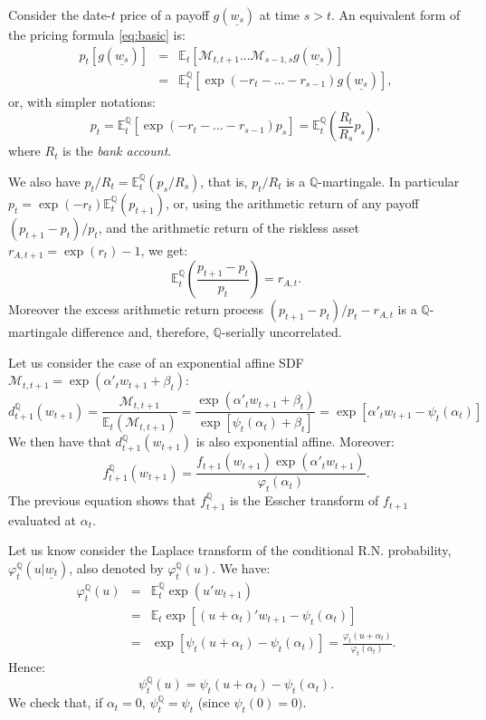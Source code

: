 \documentclass[
  12pt,
]{book}
\theoremstyle{definition}
\theoremstyle{definition}
\theoremstyle{definition}
\theoremstyle{definition}
\theoremstyle{remark}
\begin{document}
Consider the date-\(t\) price of a payoff \(g(\underline{w_s})\) at time \(s>t\). An equivalent form of the pricing formula \eqref{eq:basic} is:
\begin{eqnarray*}
p_t[g(\underline{w_s})] &=& \mathbb{E}_t[\mathcal{M}_{t,t+1}...\mathcal{M}_{s-1,s}g(\underline{w_s})] \\
&=& \mathbb{E}^{\mathbb{Q}}_t[\exp(-r_{t}-...-r_{s-1})g(\underline{w_s})],
\end{eqnarray*}
or, with simpler notations:
\[
p_t = \mathbb{E}^{\mathbb{Q}}_t[\exp(-r_{t}-...-r_{s-1})p_s] = \mathbb{E}^{\mathbb{Q}}_t\left(\frac{R_t}{R_s} p_s\right),
\]
where \(R_t\) is the \emph{bank account}.

We also have \(p_t/R_t = \mathbb{E}^{\mathbb{Q}}_t\left( p_s/R_s\right)\), that is, \(p_t/R_t\) is a \(\mathbb{Q}\)-martingale. In particular \(p_t = \exp(-r_{t})\mathbb{E}^{\mathbb{Q}}_t(p_{t+1})\), or, using the arithmetic return of any payoff \((p_{t+1}-p_t)/p_t\), and the arithmetic return of the riskless asset \(r_{A,t+1}=\exp(r_{t})-1\), we get:
\[
\mathbb{E}^{\mathbb{Q}}_t\left(\frac{p_{t+1}-p_t}{p_t}\right)=r_{A,t}.
\]
Moreover the excess arithmetic return process \((p_{t+1}-p_t)/p_t-r_{A,t}\) is a \(\mathbb{Q}\)-martingale difference and, therefore, \(\mathbb{Q}\)-serially uncorrelated.

Let us consider the case of an exponential affine SDF \(\mathcal{M}_{t,t+1}=\exp(\alpha'_t w_{t+1}+\beta_t)\):
\[
d^{\mathbb{Q}}_{t+1}(w_{t+1}) = \frac{\mathcal{M}_{t,t+1}}{\mathbb{E}_t(\mathcal{M}_{t,t+1})} = \frac{\exp(\alpha'_t
w_{t+1}+\beta_t)}{\exp[\psi_t(\alpha_t)+\beta_t]} = \exp[\alpha'_t w_{t+1}-\psi_t(\alpha_t)]
\]
We then have that \(d^{\mathbb{Q}}_{t+1}(w_{t+1})\) is also exponential affine. Moreover:
\[
f^{\mathbb{Q}}_{t+1} (w_{t+1}) = \frac{f_{t+1} (w_{t+1}) \exp (\alpha'_t w_{t+1})}{\varphi_t (\alpha_t)}.
\]
The previous equation shows that \(f^{\mathbb{Q}}_{t+1}\) is the Esscher transform of \(f_{t+1}\) evaluated at \(\alpha_t\).

Let us know consider the Laplace transform of the conditional R.N. probability, \(\varphi^{\mathbb{Q}}_t(u|\underline{w_t})\), also denoted by \(\varphi^{\mathbb{Q}}_t(u)\). We have:
\begin{eqnarray*}
\varphi^{\mathbb{Q}}_t(u) &=& \mathbb{E}^{\mathbb{Q}}_t \exp(u' w_{t+1}) \\
&=& \mathbb{E}_t \exp[(u+\alpha_t)'w_{t+1}-\psi_t(\alpha_t)] \\
&=& \exp[\psi_t(u+\alpha_t)-\psi_t(\alpha_t)] =
\frac{\varphi_t(u+\alpha_t)}{\varphi_t(\alpha_t)}.
\end{eqnarray*}
Hence:
\begin{equation}
\boxed{\psi^{\mathbb{Q}}_t(u) = \psi_t(u+\alpha_t)-\psi_t(\alpha_t).}\label{eq:transfoPQ}
\end{equation}
We check that, if \(\alpha_t=0\), \(\psi^{\mathbb{Q}}_t=\psi_t\) (since \(\psi_t(0)=0)\).
\end{document}
